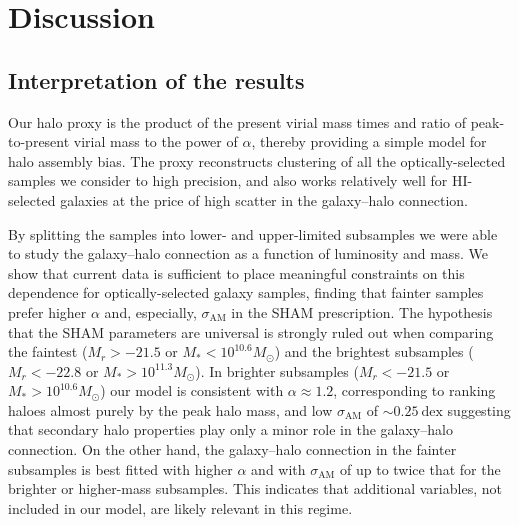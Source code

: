 \documentclass[usenatbib,useAMS]{mnras}
\newcommand{\HI}{\ensuremath{\mathrm{H}\scriptstyle\mathrm{I}}}
\newcommand{\scatter}{\ensuremath{\sigma_{\mathrm{AM}}}}
\begin{document}
\section{Discussion}\label{sec:discussion}

\subsection{Interpretation of the results}

Our halo proxy is the product of the present virial mass times and ratio of peak-to-present virial mass to the power of $\alpha$, thereby providing a simple model for halo assembly bias. The proxy reconstructs clustering of all the optically-selected samples we consider to high precision, and also works relatively well for $\HI$-selected galaxies at the price of high scatter in the galaxy--halo connection.

By splitting the samples into lower- and upper-limited subsamples we were able to study the galaxy--halo connection as a function of luminosity and mass. We show that current data is sufficient to place meaningful constraints on this dependence for optically-selected galaxy samples, finding that fainter samples prefer higher $\alpha$ and, especially, $\scatter$ in the \ac{SHAM} prescription. The hypothesis that the \ac{SHAM} parameters are universal is strongly ruled out when comparing the faintest ($M_r > -21.5$ or $M_* < 10^{10.6} M_\odot$) and the brightest subsamples ($M_r < -22.8$ or $M_* > 10^{11.3} M_\odot$). In brighter subsamples ($M_r < -21.5$ or $M_* > 10^{10.6}M_\odot$) our model is consistent with $\alpha \approx 1.2$, corresponding to ranking haloes almost purely by the peak halo mass, and low $\scatter$ of $\sim 0.25~\mathrm{dex}$ suggesting that secondary halo properties play only a minor role in the galaxy--halo connection. On the other hand, the galaxy--halo connection in the fainter subsamples is best fitted with higher $\alpha$ and with $\scatter$ of up to twice that for the brighter or higher-mass subsamples. This indicates that additional variables, not included in our model, are likely relevant in this regime.
\end{document}

